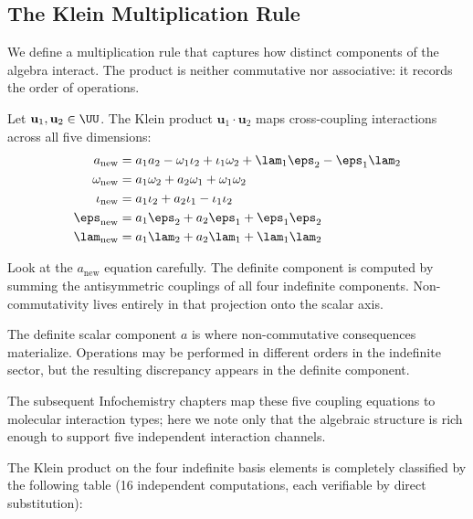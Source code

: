 \subsection{The Klein Multiplication Rule}\label{sec:klein}

We define a multiplication rule that captures how distinct components of the algebra interact. The product is neither commutative nor associative: it records the order of operations.

\begin{definition}\label{def:klein}
Let $\mathbf{u}_1, \mathbf{u}_2 \in \UU$. The Klein product $\mathbf{u}_1 \cdot \mathbf{u}_2$ maps cross-coupling interactions across all five dimensions:
\begin{align}
a_{\mathrm{new}} &= a_1 a_2 - \omega_1 \iota_2 + \iota_1 \omega_2 + \lam_1 \eps_2 - \eps_1 \lam_2 \\
\omega_{\mathrm{new}} &= a_1 \omega_2 + a_2 \omega_1 + \omega_1 \omega_2 \\
\iota_{\mathrm{new}} &= a_1 \iota_2 + a_2 \iota_1 - \iota_1 \iota_2 \\
\eps_{\mathrm{new}} &= a_1 \eps_2 + a_2 \eps_1 + \eps_1 \eps_2 \\
\lam_{\mathrm{new}} &= a_1 \lam_2 + a_2 \lam_1 + \lam_1 \lam_2
\end{align}
\end{definition}

\begin{remark}
Look at the $a_{\mathrm{new}}$ equation carefully. The definite component is computed by summing the antisymmetric couplings of all four indefinite components. Non-commutativity lives entirely in that projection onto the scalar axis.

The definite scalar component $a$ is where non-commutative consequences materialize. Operations may be performed in different orders in the indefinite sector, but the resulting discrepancy appears in the definite component.

The subsequent Infochemistry chapters map these five coupling equations to molecular interaction types; here we note only that the algebraic structure is rich enough to support five independent interaction channels.
\end{remark}

The Klein product on the four indefinite basis elements is completely classified by the following table (16 independent computations, each verifiable by direct substitution):

